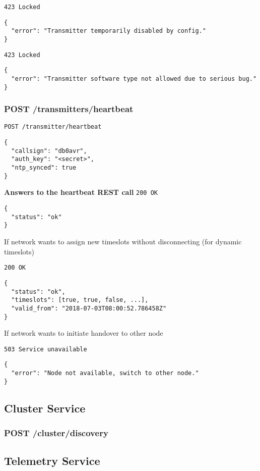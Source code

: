 \texttt{423 Locked}
\begin{lstlisting}
{
  "error": "Transmitter temporarily disabled by config."
}
\end{lstlisting}

\texttt{423 Locked}
\begin{lstlisting}
{
  "error": "Transmitter software type not allowed due to serious bug."
}
\end{lstlisting}


\subsubsection{POST /transmitters/heartbeat}
\texttt{POST /transmitter/heartbeat}
\begin{lstlisting}
{
  "callsign": "db0avr",
  "auth_key": "<secret>",
  "ntp_synced": true
}
\end{lstlisting}

\textbf{Answers to the heartbeat REST call}
\texttt{200 OK}
\begin{lstlisting}
{
  "status": "ok"
}
\end{lstlisting}

If network wants to assign new timeslots without disconnecting (for dynamic timeslots)

\texttt{200 OK}
\begin{lstlisting}
{
  "status": "ok",
  "timeslots": [true, true, false, ...],
  "valid_from": "2018-07-03T08:00:52.786458Z"
}
\end{lstlisting}

If network wants to initiate handover to other node

\texttt{503 Service unavailable}
\begin{lstlisting}
{
  "error": "Node not available, switch to other node."
}
\end{lstlisting}


\subsection{Cluster Service}

\subsubsection{POST /cluster/discovery}


\subsection{Telemetry Service}

